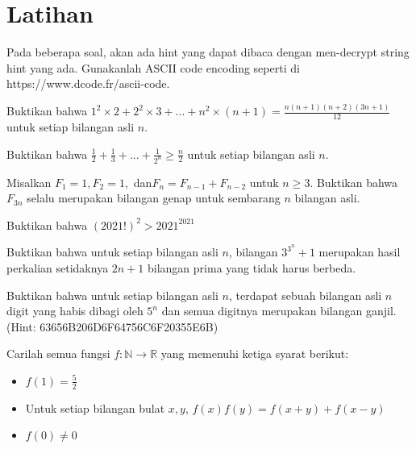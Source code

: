 \documentclass[11pt]{scrartcl}
\begin{document}
\section{Latihan}
Pada beberapa soal, akan ada hint yang dapat dibaca dengan men-decrypt string hint yang ada. Gunakanlah ASCII code encoding seperti di https://www.dcode.fr/ascii-code.
\begin{problem}
    [1,5] Buktikan bahwa $1^2 \times 2 + 2^2 \times 3 + ... + n^2 \times (n + 1) = \frac{n(n + 1)(n + 2)(3n + 1)}{12}$ untuk setiap bilangan asli $n$.
\end{problem}
    
\begin{problem}
    [1,5] Buktikan bahwa $\frac{1}{2} + \frac{1}{3} + ... + \frac{1}{2^n} \geq \frac{n}{2}$ untuk setiap bilangan asli $n$.
\end{problem}

\begin{problem}
    [2] Misalkan $F_1 = 1, F_2 = 1,$ dan$F_n = F_{n - 1} + F_{n - 2}$ untuk $n \geq 3$. Buktikan bahwa $F_{3n}$ selalu merupakan bilangan genap untuk sembarang $n$  bilangan asli.
\end{problem}

\begin{problem}
    [2,5] Buktikan bahwa $(2021!)^2 > 2021^{2021}$
\end{problem}

\begin{problem}
    [2,5] Buktikan bahwa untuk setiap bilangan asli $n$, bilangan $3^{3^n} + 1$ merupakan hasil perkalian setidaknya $2n + 1$ bilangan prima yang tidak harus berbeda.
\end{problem}

\begin{problem}
    [4,8] Buktikan bahwa untuk setiap bilangan asli $n$, terdapat sebuah bilangan asli $n$ digit yang habis dibagi oleh $5^n$ dan semua digitnya merupakan bilangan ganjil.\\
    (Hint: 63656B206D6F64756C6F20355E6B)
\end{problem}

\begin{problem}
    [3; Vietnam MO 1985] Carilah semua fungsi $f:\mathbb{N} \rightarrow \mathbb{R}$ yang memenuhi ketiga syarat berikut:
    \begin{itemize}
        \item $f(1) = \frac{5}{2}$
        \item Untuk setiap bilangan bulat $x, y$, $f(x)f(y) = f(x + y) + f(x - y)$
        \item $f(0) \neq 0$
    \end{itemize}
\end{problem}
\end{document}
